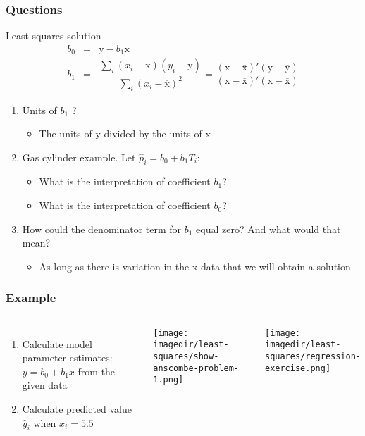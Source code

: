 \begin{frame}\frametitle{Questions}
	\begin{block}{Least squares solution}
			$$
			\begin{array}{rcl}
				b_0 &=& \overline{\mathrm{y}} - b_1\overline{\mathrm{x}} \\
				b_1 &=& \dfrac{ \sum_i{\left(x_i - \overline{\mathrm{x}}\right)\left(y_i - \overline{\mathrm{y}}\right) } }{ \sum_i{\left( x_i - \overline{\mathrm{x}}\right)^2} } = \dfrac{\left(\mathrm{x} - \overline{\mathrm{x}}\right)'\left(\mathrm{y} - \overline{\mathrm{y}}\right)}{\left(\mathrm{x} - \overline{\mathrm{x}}\right)'\left(\mathrm{x} - \overline{\mathrm{x}}\right)}
			\end{array}
			$$
	\end{block}
	\begin{enumerate}
		\item	Units of $b_1$ ?
		\begin{itemize}
			\item	The units of $\mathrm{y}$ divided by the units of $\mathrm{x}$
		\end{itemize}
		\item	Gas cylinder example. Let $\hat{p}_i = b_0 + b_1 T_i$:
		\begin{itemize}
			\item	What is the interpretation of coefficient $b_1$?
			\item	What is the interpretation of coefficient $b_0$?
		\end{itemize}
		\item	How could the denominator term for $b_1$ equal zero? And what would that mean?
		\begin{itemize}
			\item	As long as there is variation in the x-data that we will obtain a solution
		\end{itemize}
	\end{enumerate}
\end{frame}

\begin{frame}\frametitle{Example}
	\begin{columns}
		\column{5cm}
			\begin{enumerate}
				\item	Calculate model parameter estimates: $y = b_0 + b_1 x$ from the given data
				\item	Calculate predicted value $\hat{y}_i$ when $x_i = 5.5$
			\end{enumerate}
			\begin{center}
				\texttt{[image: \\imagedir/least-squares/show-anscombe-problem-1.png]}
			\end{center}
		\column{5cm}
			\begin{center}
				\texttt{[image: \\imagedir/least-squares/regression-exercise.png]}
			\end{center}
	\end{columns}
\end{frame}

